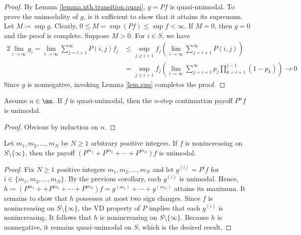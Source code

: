 \documentclass[11pt]{article}
\begin{document}
\begin{proof}
	By Lemma \ref{lemma.nth.transition.quasi}, $g=Pf$ is quasi-unimodal. To prove  the unimodality of $g$, is it sufficient to show that it attains its supremum.  Let $M \coloneqq \sup g$. Clearly,  $0 \le M = \sup (Pf) \le \sup f < \infty$. If $M=0$, then $g=0$ and the proof is complete. Suppose $M > 0$. For $i \in S$, we have
	\begin{alignat*}{2}
		\lim_{i \to \infty} g_i = \lim_{i \to \infty}\sum_{j=i+1}^\infty P(i,j) f_j &\leq\sup_{j \geq i+1} f_j  \left( \lim_{i \to \infty}\sum_{j=i+1}^\infty P(i,j) \right) \\
		&= \sup_{j \geq i+1} f_j \left( \lim_{i \to \infty}\sum_{j=i+1}^\infty p_j \prod_{k=i+1}^{j-1} (1 - p_k)\right) \to 0
	\end{alignat*}
Since $g$ is nonnegative, invoking Lemma \ref{lem.sup} completes  the proof.
\end{proof}

\begin{cor}\label{cor.quasi_unimodality_nstopping}
Assume $n \in \mn$.	If $f$ is quasi-unimodal, then the $n$-step continuation payoff	$P^nf$  is unimodal.
\end{cor}
\begin{proof}
	Obvious by induction on $n$.
\end{proof}


\begin{lemma}\label{lem.quasi_unimodality_sum_nstopping}
Let $m_1, m_2, \ldots, m_N$ be $N \ge 1$ arbitrary positive integers. 	If $f$ is nonincreasing on $S \setminus \{\infty\}$, then the  payoff	$(P^{m_1} + P^{m_2} +  \cdots + P^{m_N})f$ is unimodal.
\end{lemma}
\begin{proof}
 Fix $N \ge 1$ positive integers $m_1, m_2, \ldots, m_N$ and  let  $g^{(i)} = P^i f $ for $i \in \{ m_1, m_2, \ldots, m_N\}$. By the previous corollary, each $g^{(i)}$ is unimodal. Hence, $h \coloneqq (P^{m_1} + + P^{m_2} +  \cdots + P^{m_N})f = g^{(m_1)} +  \cdots + g^{(m_N)}$ attains its maximum. It remains to show that $h$ possesses at most two sign changes. Since $f$ is nonincreasing on $S \setminus \{\infty\}$, the VD property of $P$ implies that each $g^{(i)}$  is nonincreasing. It follows that  $h$ is nonincreasing on $S \setminus \{\infty\}$. Because $h$ is nonnegative, it remains quasi-unimodal on $S$, which is the desired result.
\end{proof}

\end{document}
